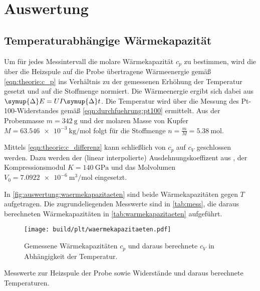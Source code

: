 \section{Auswertung}
\label{sec:auswertung}

\subsection{Temperaturabhängige Wärmekapazität}
Um für jedes Messintervall die molare Wärmekapazität $c_p$ zu bestimmen,
wird die über die Heizspule auf die Probe übertragene Wärmeenergie
gemäß \autoref{eqn:theorie:c_p}
ins Verhältnis zu der gemessenen Erhöhung der Temperatur gesetzt
und auf die Stoffmenge normiert.
Die Wärmeenergie ergibt sich dabei aus $\symup{\Delta}E = U I \symup{\Delta}t$.
Die Temperatur wird über die Messung des Pt-100-Widerstandes gemäß \autoref{eqn:durchfuehrung:pt100} ermittelt.
Aus der Probenmasse $m = \SI{342}{\gram}$ \cite{versuchsanleitung}
und der molaren Masse von Kupfer $M = \SI{63.546e-3}{\kilogram\per\mol}$ \cite{periodictable}
folgt für die Stoffmenge $n = \frac{m}{M} = \SI{5.38}{\mol}$.

Mittels \autoref{eqn:theorie:c_differenz} kann schließlich von $c_p$ auf $c_V$ geschlossen werden.
Dazu werden
der (linear interpolierte) Ausdehnungskoeffizent aus \cite[Tabelle 2]{versuchsanleitung},
der Kompressionsmodul $K = \SI{140}{\giga\pascal}$ \cite{periodictable} und
das Molvolumen $V_0 = \SI{7.0922e-6}{\cubic\meter\per\mol}$ eingesetzt.

In \autoref{fig:auswertung:waermekapazitaeten} sind beide Wärmekapazitäten gegen $T$ aufgetragen.
Die zugrundeliegenden Messwerte sind in \autoref{tab:mess},
die daraus berechneten Wärmekapazitäten in \autoref{tab:warmekapazitaeten} aufgeführt.

\begin{figure}[H]
    \centering
    \texttt{[image: build/plt/waermekapazitaeten.pdf]}
    \caption{Gemessene Wärmekapazitäten $c_p$ und daraus berechnete $c_V$ in Abhängigkeit der Temperatur.}
    \label{fig:auswertung:waermekapazitaeten}
\end{figure}

\begin{table}
    \centering
    \caption{Messwerte zur Heizspule der Probe sowie Widerstände und daraus berechnete Temperaturen.}
    \label{tab:mess}
\end{table}

